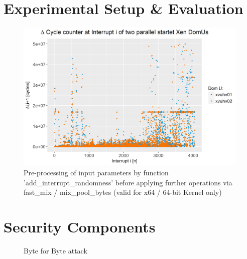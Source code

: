 \chapter{Experimental Setup \& Evaluation}
\label{chap:exp-setup-eavluation}




%  

\begin{figure}[H]
	\label{fig:fast-pool}
	\centering
	\includegraphics[scale=0.8]{img/diff_cycles.png}
	\caption{Pre-processing of input parameters by function 'add\_interrupt\_randomness' before applying further operations via fast\_mix / mix\_pool\_bytes (valid for x64 / 64-bit Kernel only)}
\end{figure}

%




\chapter{Security Components}
\label{chap:sec-components}


\begin{figure}[H]
	\centering
	
	\caption{Byte for Byte attack} \label{fig:byte-for-byte}
\end{figure}


